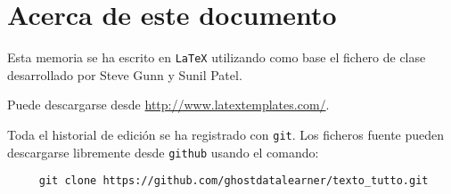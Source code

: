 
\appendix
\renewcommand{\thechapter}{C}
\chapter{Acerca de este documento} %

\label{APP_ABOUT} %

Esta memoria se ha escrito en \texttt{LaTeX} utilizando como base el fichero de clase desarrollado por Steve Gunn y Sunil Patel.

Puede descargarse desde \url{http://www.latextemplates.com/}.

Toda el historial de edición se ha registrado con \texttt{git}. Los ficheros fuente pueden descargarse libremente desde \texttt{github} usando el comando:

\fontsize{3.5mm}{3.5mm}\selectfont
\begin{verbatim}
     git clone https://github.com/ghostdatalearner/texto_tutto.git
\end{verbatim}
\normalsize